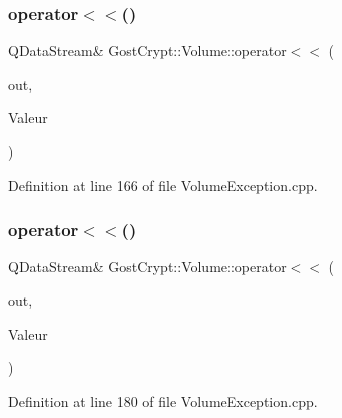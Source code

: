 \subsubsection{\texorpdfstring{operator$<$$<$()}{operator<<()}\hspace{0.1cm}{\footnotesize\ttfamily [12/19]}}
{\footnotesize\ttfamily Q\+Data\+Stream\& Gost\+Crypt\+::\+Volume\+::operator$<$$<$ (\begin{DoxyParamCaption}\item[{Q\+Data\+Stream \&}]{out,  }\item[{const \hyperlink{class_gost_crypt_1_1_volume_1_1_failed_get_timestamps}{Gost\+Crypt\+::\+Volume\+::\+Failed\+Get\+Timestamps} \&}]{Valeur }\end{DoxyParamCaption})}



Definition at line 166 of file Volume\+Exception.\+cpp.

\mbox{\label{namespace_gost_crypt_1_1_volume_a9bc5f7ec717f211b8d3c01f2163f3fa8}} 
\subsubsection{\texorpdfstring{operator$<$$<$()}{operator<<()}\hspace{0.1cm}{\footnotesize\ttfamily [13/19]}}
{\footnotesize\ttfamily Q\+Data\+Stream\& Gost\+Crypt\+::\+Volume\+::operator$<$$<$ (\begin{DoxyParamCaption}\item[{Q\+Data\+Stream \&}]{out,  }\item[{const \hyperlink{class_gost_crypt_1_1_volume_1_1_failed_get_sector_size}{Gost\+Crypt\+::\+Volume\+::\+Failed\+Get\+Sector\+Size} \&}]{Valeur }\end{DoxyParamCaption})}



Definition at line 180 of file Volume\+Exception.\+cpp.

\mbox{\label{namespace_gost_crypt_1_1_volume_aa0a176f2ba1064ac134d5dea934193c5}} 
